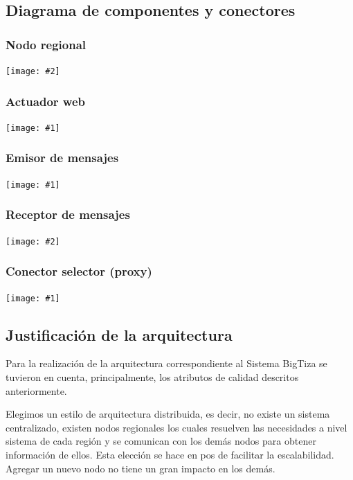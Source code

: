 \documentclass[a4paper, 10pt, twoside]{article}
\newcommand{\diagrama}[1]{
  \begin{center}
    \texttt{[image: \#1]}
  \end{center}
}
\newcommand{\diagramadeancho}[2]{
  \begin{center}
    \texttt{[image: \#2]}
  \end{center}
}
\begin{document}
\subsection{Diagrama de componentes y conectores}


\subsubsection{Nodo regional}

\diagramadeancho{14cm}{./diagramas/nodoregional.pdf}
\newpage


\subsubsection{Actuador web}

\diagrama{./diagramas/actuadorweb.pdf}
\newpage


\subsubsection{Emisor de mensajes}

\diagrama{./diagramas/emisordemensajes.pdf}
\newpage


\subsubsection{Receptor de mensajes}

\diagramadeancho{12cm}{./diagramas/receptordemensajes.pdf}
\newpage


\subsubsection{Conector selector (proxy)}

\diagrama{./diagramas/conectorselector.pdf}
\newpage


\subsection{Justificación de la arquitectura}

Para la realización de la arquitectura correspondiente al Sistema BigTiza se tuvieron en cuenta, principalmente, los atributos de calidad descritos anteriormente. 

Elegimos un estilo de arquitectura distribuida, es decir, no existe un sistema centralizado, existen nodos regionales los cuales resuelven las necesidades a nivel sistema de cada región y se comunican con los demás nodos para obtener información de ellos. Esta elección se hace en pos de facilitar la escalabilidad. Agregar un nuevo nodo no tiene un gran impacto en los demás. 
\end{document}
